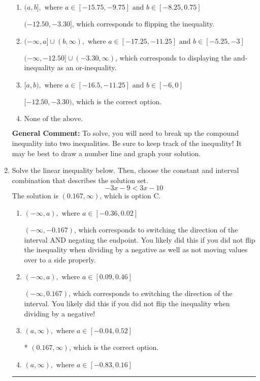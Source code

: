 \documentclass{extbook}[14pt]
\newcommand{\litem}[1]{\item #1

\rule{\textwidth}{0.4pt}}
\begin{document}
\begin{enumerate}
{\begin{enumerate}[label=\Alph*.]
$(-\infty, -12.50) \cup [-3.30, \infty)$, which corresponds to displaying the and-inequality as an or-inequality AND flipping the inequality.
\item \( (a, b], \text{ where } a \in [-15.75, -9.75] \text{ and } b \in [-8.25, 0.75] \)

$(-12.50, -3.30]$, which corresponds to flipping the inequality.
\item \( (-\infty, a] \cup (b, \infty), \text{ where } a \in [-17.25, -11.25] \text{ and } b \in [-5.25, -3] \)

$(-\infty, -12.50] \cup (-3.30, \infty)$, which corresponds to displaying the and-inequality as an or-inequality.
\item \( [a, b), \text{ where } a \in [-16.5, -11.25] \text{ and } b \in [-6, 0] \)

$[-12.50, -3.30)$, which is the correct option.
\item \( \text{None of the above.} \)


\end{enumerate}

\textbf{General Comment:} To solve, you will need to break up the compound inequality into two inequalities. Be sure to keep track of the inequality! It may be best to draw a number line and graph your solution.
}
\litem{
Solve the linear inequality below. Then, choose the constant and interval combination that describes the solution set.
\[ -3x -9 < 3x -10 \]The solution is \( (0.167, \infty) \), which is option C.\begin{enumerate}[label=\Alph*.]
\item \( (-\infty, a), \text{ where } a \in [-0.36, 0.02] \)

 $(-\infty, -0.167)$, which corresponds to switching the direction of the interval AND negating the endpoint. You likely did this if you did not flip the inequality when dividing by a negative as well as not moving values over to a side properly.
\item \( (-\infty, a), \text{ where } a \in [0.09, 0.46] \)

 $(-\infty, 0.167)$, which corresponds to switching the direction of the interval. You likely did this if you did not flip the inequality when dividing by a negative!
\item \( (a, \infty), \text{ where } a \in [-0.04, 0.52] \)

* $(0.167, \infty)$, which is the correct option.
\item \( (a, \infty), \text{ where } a \in [-0.83, 0.16] \)


\end{enumerate}}
\end{enumerate}
\end{document}
